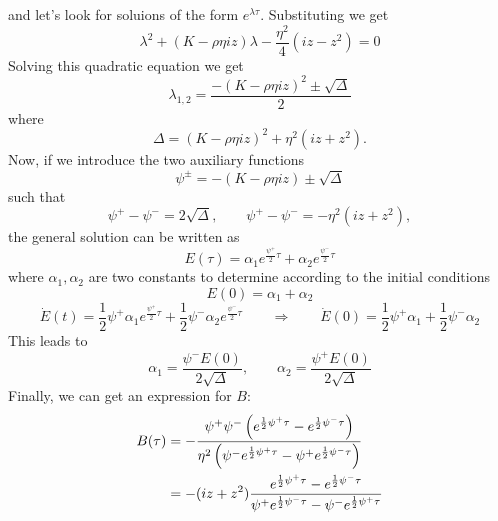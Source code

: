 and let's look for soluions of the form $e^{\lambda \tau}$. Substituting we get
\begin{equation*}
    \lambda^2 + (K-\rho\eta iz) \lambda - \frac{\eta^2}{4}(iz-z^2) = 0
\end{equation*}
Solving this quadratic equation we get
\begin{equation*}
    \lambda_{1,2} = \frac{-(K-\rho\eta iz)^2 \pm \sqrt{\Delta}}{2}
\end{equation*}
where
\begin{equation*}
    \Delta = (K-\rho\eta iz)^2 + \eta^2(iz+z^2).
\end{equation*}
Now, if we introduce the two auxiliary functions
\begin{equation*}
    \psi^{\pm} = -(K-\rho\eta iz) \pm \sqrt{\Delta}
\end{equation*}
such that
\begin{equation*}
    \psi^+-\psi^- = 2\sqrt{\Delta}, \qquad \psi^+-\psi^- = -\eta^2(iz+z^2),
\end{equation*}
the general solution can be written as
\begin{equation}
    E(\tau) = \alpha_1 e^{\frac{\psi^+}{2}\tau} + \alpha_2 e^{\frac{\psi^-}{2}\tau}
\end{equation}
where $\alpha_1, \alpha_2$ are two constants to determine according to the initial conditions
\begin{equation*}
    E(0) = \alpha_1 + \alpha_2
\end{equation*}
\begin{equation*}
    \dot{E}(t) = \frac{1}{2}\psi^+\alpha_1 e^{\frac{\psi^+}{2}\tau} + \frac{1}{2}\psi^-\alpha_2 e^{\frac{\psi^-}{2}\tau} \qquad \Rightarrow \qquad \dot{E}(0) = \frac{1}{2}\psi^+\alpha_1 + \frac{1}{2}\psi^-\alpha_2
\end{equation*}
This leads to
\begin{equation*}
    \alpha_1 = \frac{\psi^- E(0)}{2\sqrt{\Delta}}, \qquad \alpha_2 = \frac{\psi^+ E(0)}{2\sqrt{\Delta}}
\end{equation*}
Finally, we can get an expression for $B$:
\begin{align}
    \notag B(\tau) &= -\frac{
    \psi^+ \psi^- \left(
    e^{\frac{1}{2}\psi^+\tau} - e^{\frac{1}{2}\psi^-\tau}
    \right)
    }{
    \eta^2\left(
    \psi^- e^{\frac{1}{2}\psi^+\tau} - \psi^+ e^{\frac{1}{2}\psi^-\tau}
    \right)} \\
    &=
    -(iz+z^2)\frac{e^{\frac{1}{2}\psi^+\tau} - e^{\frac{1}{2}\psi^-\tau}}{\psi^+ e^{\frac{1}{2}\psi^-\tau} - \psi^- e^{\frac{1}{2}\psi^+\tau}}
\end{align}
